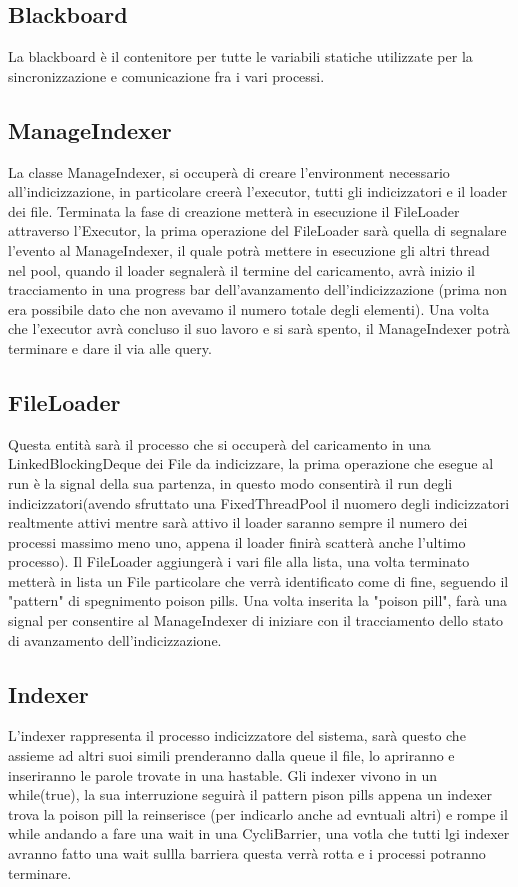 \documentclass{article}
\begin{document}
\subsection{Blackboard}
La blackboard è il contenitore per tutte le variabili statiche utilizzate per la sincronizzazione e comunicazione fra i vari processi.
\subsection{ManageIndexer}
La classe ManageIndexer, si occuperà di creare l'environment necessario all'indicizzazione, in particolare creerà l'executor, tutti gli indicizzatori e il loader dei file. Terminata la fase di creazione metterà in esecuzione il FileLoader attraverso l'Executor, la prima operazione del FileLoader sarà quella di segnalare l'evento al ManageIndexer, il quale potrà mettere in esecuzione gli altri thread nel pool, quando il loader segnalerà il termine del caricamento, avrà inizio il tracciamento in una progress bar dell'avanzamento dell'indicizzazione (prima non era possibile dato che non avevamo il numero totale degli elementi). Una volta che l'executor avrà concluso il suo lavoro e si sarà spento, il ManageIndexer potrà terminare e dare il via alle query.
\subsection{FileLoader}
Questa entità sarà il processo che si occuperà del caricamento in una LinkedBlockingDeque dei File da indicizzare, la prima operazione che esegue al run è la signal della sua partenza, in questo modo consentirà il run degli indicizzatori(avendo sfruttato una FixedThreadPool il nuomero degli indicizzatori realtmente attivi mentre sarà attivo il loader saranno sempre il numero dei processi massimo meno uno, appena il loader finirà scatterà anche l'ultimo processo). Il FileLoader aggiungerà i vari file alla lista, una volta terminato metterà in lista un File particolare che verrà identificato come di fine, seguendo il "pattern" di spegnimento poison pills. Una volta inserita la "poison pill", farà una signal per consentire al ManageIndexer di iniziare con il tracciamento dell\textsl{}o stato di avanzamento dell'indicizzazione.
\subsection{Indexer}
L'indexer rappresenta il processo indicizzatore del sistema, sarà questo che assieme ad altri suoi simili prenderanno dalla queue il file, lo apriranno e inseriranno le parole trovate in una hastable. Gli indexer vivono in un while(true), la sua interruzione seguirà il pattern pison pills appena un indexer trova la poison pill la reinserisce (per indicarlo anche ad evntuali altri) e rompe il while andando a fare una wait in una CycliBarrier, una votla che tutti lgi indexer avranno fatto una wait sullla barriera questa verrà rotta e i processi potranno terminare.
\end{document}
